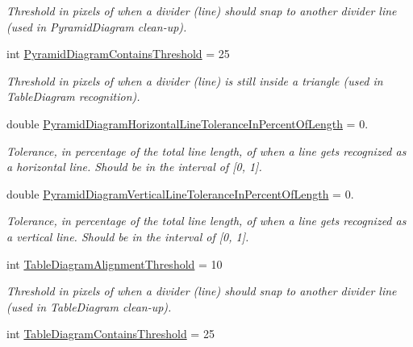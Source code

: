 \begin{DoxyCompactItemize}
\begin{DoxyCompactList}\small\item\em \-Threshold in pixels of when a divider (line) should snap to another divider line (used in \-Pyramid\-Diagram clean-\/up). \end{DoxyCompactList}\item 
int \hyperlink{class_brown_recognition_common_1_1_brown_recognition_settings_a9d5220bd3119b66c88738645ee926141}{\-Pyramid\-Diagram\-Contains\-Threshold} = 25
\begin{DoxyCompactList}\small\item\em \-Threshold in pixels of when a divider (line) is still inside a triangle (used in \-Table\-Diagram recognition). \end{DoxyCompactList}\item 
double \hyperlink{class_brown_recognition_common_1_1_brown_recognition_settings_aea26506fd91b091ccb489054aaee7aa2}{\-Pyramid\-Diagram\-Horizontal\-Line\-Tolerance\-In\-Percent\-Of\-Length} = 0.
\begin{DoxyCompactList}\small\item\em \-Tolerance, in percentage of the total line length, of when a line gets recognized as a horizontal line. \-Should be in the interval of \mbox{[}0, 1\mbox{]}. \end{DoxyCompactList}\item 
double \hyperlink{class_brown_recognition_common_1_1_brown_recognition_settings_a30fd2b7a66d09e018016781720e5070b}{\-Pyramid\-Diagram\-Vertical\-Line\-Tolerance\-In\-Percent\-Of\-Length} = 0.
\begin{DoxyCompactList}\small\item\em \-Tolerance, in percentage of the total line length, of when a line gets recognized as a vertical line. \-Should be in the interval of \mbox{[}0, 1\mbox{]}. \end{DoxyCompactList}\item 
int \hyperlink{class_brown_recognition_common_1_1_brown_recognition_settings_afe4e9f0ca9dbb24dec2af592f5cddbc6}{\-Table\-Diagram\-Alignment\-Threshold} = 10
\begin{DoxyCompactList}\small\item\em \-Threshold in pixels of when a divider (line) should snap to another divider line (used in \-Table\-Diagram clean-\/up). \end{DoxyCompactList}\item 
int \hyperlink{class_brown_recognition_common_1_1_brown_recognition_settings_a57bb48bd1047135f656b981478c8c24a}{\-Table\-Diagram\-Contains\-Threshold} = 25

\end{DoxyCompactItemize}
